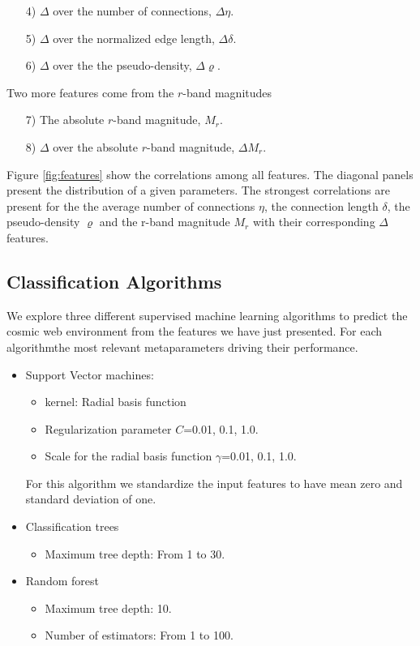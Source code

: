 \documentclass[usenatbib]{mnras}
\begin{document}
\begin{enumerate}
\item[4)] $\Delta$ over the number of connections, $\Delta\eta$.
\item[5)] $\Delta$ over the normalized edge length, $\Delta\delta$.
\item[6)] $\Delta$ over the the pseudo-density, $\Delta\varrho$.
\end{enumerate}

\noindent
Two more features come from the $r$-band magnitudes
\begin{enumerate}
\item[7)] The absolute $r$-band magnitude, $M_r$.
\item[8)] $\Delta$ over the absolute $r$-band magnitude, $\Delta M_r$.
\end{enumerate}

Figure \ref{fig:features} show the correlations among all features.
The diagonal panels present the distribution of a given parameters.
The strongest correlations are present for the the average number of
connections $\eta$, the connection length $\delta$, the
pseudo-density $\varrho$ and the r-band magnitude $M_r$ with their
corresponding $\Delta$ features.





\subsection{Classification Algorithms}

We explore three different supervised machine learning algorithms to
predict the cosmic web environment from the features we have just
presented. 
For each algorithmthe most relevant metaparameters driving their
performance.

\begin{itemize}
    \item Support Vector machines: 
        \begin{itemize}
            \item kernel: Radial basis function
            \item Regularization parameter $C$=0.01, 0.1, 1.0.
            \item Scale for the radial basis function  $\gamma$=0.01, 0.1, 1.0.
        \end{itemize}
        For this algorithm we standardize the input features to have
        mean zero and standard deviation of one. 
    \item Classification trees
      \begin{itemize}
      \item Maximum tree depth: From 1 to 30.
      \end{itemize}
    \item Random forest
        \begin{itemize}
            \item Maximum tree depth: 10.
            \item Number of estimators: From 1 to 100.
        \end{itemize}
\end{itemize}
\end{document}
